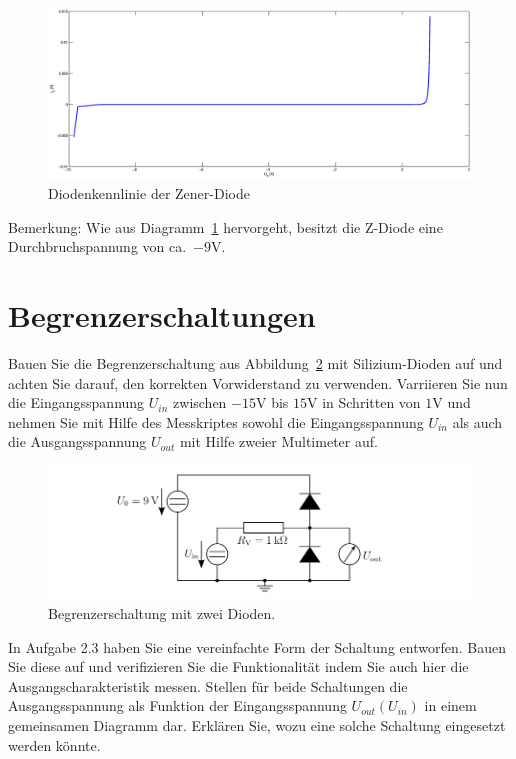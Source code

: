 \documentclass[10pt]{scrreprt}
\begin{document}
    \begin{figure}[H]
        \includegraphics[width=\textwidth]{ZGes}
        \caption{Diodenkennlinie der Zener-Diode}
        \label{fig:ZDiode}
    \end{figure}

    Bemerkung: Wie aus Diagramm~\ref{fig:ZDiode} hervorgeht, besitzt die Z-Diode
    eine Durchbruchspannung von ca.~$-9\si{\volt}$.

    \section{Begrenzerschaltungen}
    Bauen Sie die Begrenzerschaltung aus Abbildung~\ref{fig:abb14} mit Silizium-Dioden auf und achten
    Sie darauf, den korrekten Vorwiderstand zu verwenden. Varriieren Sie nun die Eingangsspannung
    $U_{in}$ zwischen $-15\si{\volt}$ bis $15\si{\volt}$ in Schritten von $1\si{\volt}$ und nehmen Sie mit Hilfe des
    Messkriptes sowohl die Eingangsspannung $U_{in}$ als auch die Ausgangsspannung $U_{out}$ mit
    Hilfe zweier Multimeter auf.
    \begin{figure}[H]
        \centering
        \includegraphics[width=\textwidth]{abb14.png}
        \caption{Begrenzerschaltung mit zwei Dioden.}
        \label{fig:abb14}
    \end{figure}
    In Aufgabe 2.3 haben Sie eine vereinfachte Form der Schaltung entworfen. Bauen Sie
    diese auf und verifizieren Sie die Funktionalität indem Sie auch hier die
    Ausgangscharakteristik messen. Stellen für beide Schaltungen die Ausgangsspannung als
    Funktion der Eingangsspannung $U_{out} (U_{in})$ in einem gemeinsamen Diagramm dar.
    Erklären Sie, wozu eine solche Schaltung eingesetzt werden könnte.
\end{document}
